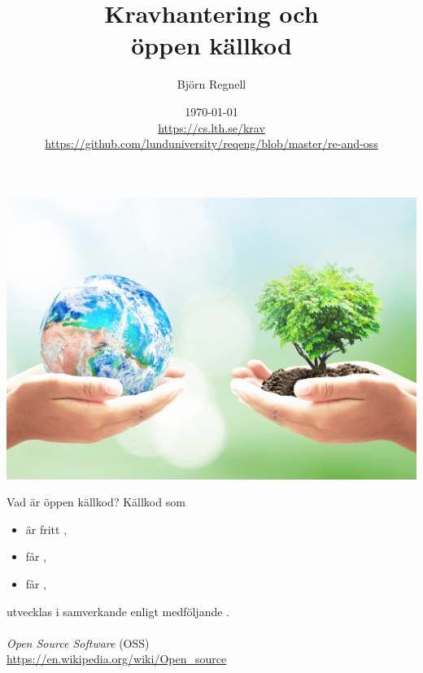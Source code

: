 \documentclass{simpleslides}
\title{Kravhantering och\\ öppen källkod}
\author{Björn Regnell}
\institute{Datavetenskap, LTH, Lunds universitet}
\date{\tiny \today \\ \url{https://cs.lth.se/krav} \\ \url{https://github.com/lunduniversity/reqeng/blob/master/re-and-oss}}
\begin{document}
\addtolength{\leftmargini}{-0\labelsep}


\frame{\titlepage}




{  
\begin{Slide}{}
  \vspace*{0.5cm}\hspace*{-0.75cm}\includegraphics[width=1.2\textwidth]{img/earth-tree.jpg}

 {\fontsize{13}{13}\selectfont {}}
\end{Slide}
}

\begin{Slide}{Vad är öppen källkod?}
Källkod som 
  \begin{itemize}
    \item är fritt ,
    \item får ,
    \item får ,
  \end{itemize}
  utvecklas i samverkande  enligt medföljande . \\~\\
{\small \emph{Open Source Software} (OSS) \\ \href{https://en.wikipedia.org/wiki/Open_source}{https://en.wikipedia.org/wiki/Open\_source}}
\end{Slide}
\end{document}

